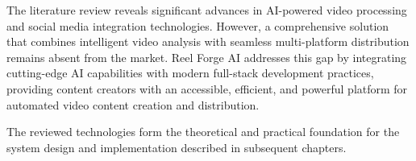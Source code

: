 The literature review reveals significant advances in AI-powered video processing and social media integration technologies. However, a comprehensive solution that combines intelligent video analysis with seamless multi-platform distribution remains absent from the market. Reel Forge AI addresses this gap by integrating cutting-edge AI capabilities with modern full-stack development practices, providing content creators with an accessible, efficient, and powerful platform for automated video content creation and distribution.

The reviewed technologies form the theoretical and practical foundation for the system design and implementation described in subsequent chapters.
